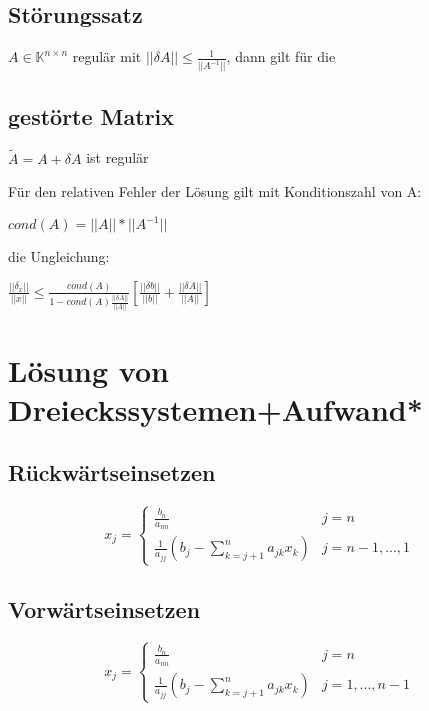 \documentclass[12pt,a4paper]{article} %
\newcommand*\tab[1][1cm]{\hspace*{#1}}
\begin{document}
	\subsection{Störungssatz}
	
	$A \in \mathbb{K}^{n \times n}$ regulär mit $||\delta A|| \le \frac{1}{||A^{-1}||}$, dann gilt für die
	
	\subsection{gestörte Matrix}
	
	$\tilde{A} = A + \delta A$ ist regulär
	
	Für den relativen Fehler der Lösung gilt mit Konditionszahl von A:
	
	\tab $cond(A) = ||A|| * ||A^{-1}||$
	
	die Ungleichung:
	
	\tab $\frac{||\delta_x||}{||x||} \le \frac{cond(A)}{1 - cond(A) \frac{||\delta A||}{||A||}}\left[ \frac{||\delta b||}{||b||} + \frac{||\delta A||}{||A||}\right] $
	
	\newpage
	
	\section{Lösung von Dreieckssystemen+Aufwand*}
	
	\subsection{Rückwärtseinsetzen}
	
	\[
		x_j=\left\{
			\begin{array}{ll}
				\frac{b_n}{a_{nn}} & j = n\\
				\frac{1}{a_{jj}}(b_j - \sum\limits_{k= j + 1}^na_{jk}x_k) & j = n - 1, ..., 1
			\end{array}
		\right.
	\]
	
	\subsection{Vorwärtseinsetzen}
	
	\[
		x_j=\left\{
			\begin{array}{ll}
				\frac{b_n}{a_{nn}} & j = n\\
				\frac{1}{a_{jj}}(b_j - \sum\limits_{k= j + 1}^na_{jk}x_k) & j = 1, ..., n - 1
			\end{array}
		\right.
	\]
	
\end{document}
